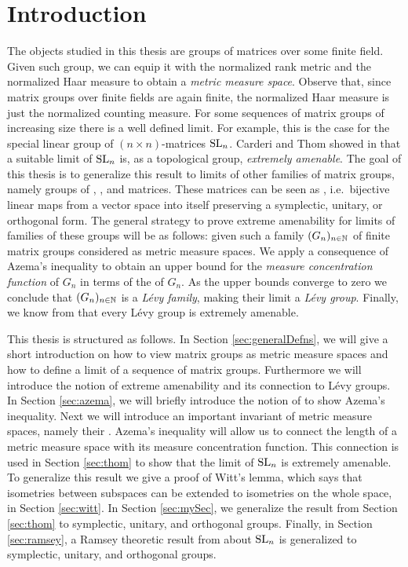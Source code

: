 
\section{Introduction}
The objects studied in this thesis are groups of matrices over some finite field.
Given such group, we can equip it with the normalized rank metric and the normalized Haar measure to obtain a \emph{metric measure space}. Observe that, since matrix groups over finite fields are again finite, the normalized Haar measure is just the normalized counting measure.
For some sequences of matrix groups of increasing size there is a well defined limit. For example, this is the case for the special linear group of $(n\times n)$-matrices $\operatorname{SL}_n$.
Carderi and Thom  showed in \cite{thom} that a suitable limit of $\operatorname{SL}_n$ is, as a topological group, \emph{extremely amenable}. The goal of this thesis is to generalize this result to limits of other families of matrix groups, namely groups of , , and  matrices.  
These matrices can be seen as , i.e.\ bijective linear maps from a vector space into itself preserving a symplectic, unitary, or orthogonal form.
The general strategy to prove extreme amenability for limits of families of these groups will be as follows: given such a family $(G_n)_{n\in\mathbb{N}}$ of finite matrix groups considered as metric measure spaces. We apply a consequence of Azema's inequality \cite{Azema} to obtain an upper bound for the \emph{measure concentration function} of $G_n$ in terms of the  of $G_n$.
As the upper bounds converge to zero we conclude that $(G_n)_{n\in\mathbb{N}}$ is a \emph{L\'{e}vy family}, making their limit a \emph{L\'{e}vy group}. Finally, we know from \cite{Levy} that every L\'{e}vy group is extremely amenable.

This thesis is structured as follows. In Section \ref{sec:generalDefns}, we will give a short introduction on how to view matrix groups as metric measure spaces and how to define a limit of a sequence of matrix groups. Furthermore we will introduce the notion of extreme amenability and its connection to L\'evy groups. In Section \ref{sec:azema}, we will briefly introduce the notion of  to show Azema's inequality. Next we will introduce an important invariant of metric measure spaces, namely their . Azema's inequality will allow us to connect the length of a metric measure space with its measure concentration function. This connection is used in Section \ref{sec:thom} to show that the limit of $\operatorname{SL}_n$ is extremely amenable. To generalize this result we give a proof of Witt's lemma, which says that isometries between subspaces can be extended to isometries on the whole space, in Section \ref{sec:witt}. In Section \ref{sec:mySec}, we generalize the result from Section \ref{sec:thom} to symplectic, unitary, and orthogonal groups. Finally, in Section \ref{sec:ramsey}, a Ramsey theoretic result from \cite{thom} about $\operatorname{SL}_n$ is generalized to symplectic, unitary, and orthogonal groups.

